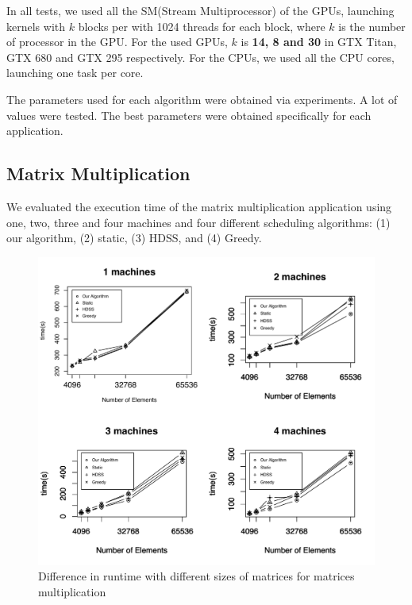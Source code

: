 \documentclass[journal]{IEEEtran}
\begin{document}
In all tests, we used all the SM(Stream Multiprocessor) of the GPUs, launching kernels with
$k$ blocks per with 1024 threads for each block, where $k$ is the number of
processor in the GPU. For the used GPUs, $k$ is \textbf{14, 8 and 30} in GTX
Titan, GTX 680 and GTX 295 respectively. For the CPUs, we used all the CPU
cores, launching one task per core.

The parameters used for each algorithm were obtained via experiments. A lot of values ​​were tested. The best parameters were obtained specifically for each application.


\subsection{Matrix Multiplication}

We evaluated the execution time of the matrix multiplication application using
one, two, three and four machines and four different scheduling algorithms: (1) our
algorithm, (2) static, (3) HDSS, and (4) Greedy. 

\begin{figure}[htb]
	\begin{center}
	\centering
			\includegraphics[scale=0.47]{TesteMatrizes.pdf}
	\caption{Difference in runtime with different sizes of matrices for matrices multiplication}
	\label{fig:todosJuntos}
	\end{center}
\end{figure}
\end{document}
